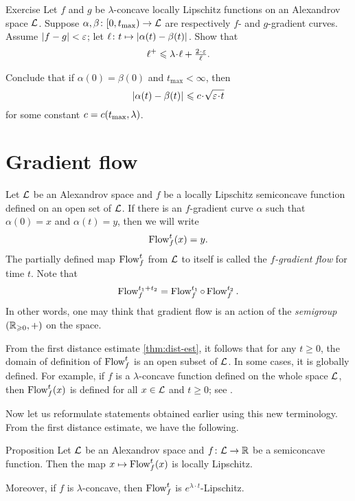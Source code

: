 \begin{thm}{Exercise}\label{lem:fg-dist-est}
Let $f$ and $g$ be $\lambda$-concave locally Lipschitz functions on an Alexandrov space $\mathcal{L}$.
Suppose
$\alpha,\beta\colon[0,t_{\max})\to \mathcal{L}$ are respectively $f$- and $g$-gradient curves.
Assume $|f-g|<\varepsilon$; let $\ell\:t\mapsto\dist{\alpha(t)}{\beta(t)}{}$.
Show that
\[\ell^+\le \lambda\cdot\ell+\tfrac{2\cdot\eps}{\ell}.\]

Conclude that if $\alpha(0)=\beta(0)$ and $t_{\max}<\infty$, then
\[\dist{\alpha(t)}{\beta(t)}{}
\le
\Const\cdot\sqrt{\eps\cdot t}\]
for some constant $c=c(t_{\max},\lambda)$.
\end{thm}

\section{Gradient flow}

Let $\mathcal{L}$ be an Alexandrov space 
and $f$ be a locally Lipschitz semiconcave function defined on an open set of $\mathcal{L}$.
If there is an $f$-gradient curve $\alpha$ such that $\alpha(0)=x$ and $\alpha(t)=y$,
then we will write 
\[\mathop{\rm Flow}\nolimits^t_f(x)=y.\]
The partially defined map $\mathop{\rm Flow}\nolimits^t_f$ from $\mathcal{L}$ to itself is called the \emph{$f$-gradient flow} for time $t$.
Note that
\[\mathop{\rm Flow}\nolimits^{t_1+t_2}_f=\mathop{\rm Flow}\nolimits_f^{t_1}\circ\mathop{\rm Flow}\nolimits_f^{t_2}.\]
In other words, one may think that gradient flow is an action of the \textit{semigroup} $(\mathbb{R}_{\geqslant0},+)$ on the space.
 
From the first distance estimate \ref{thm:dist-est}, 
it follows that for any $t\ge 0$, the domain of definition of $\mathop{\rm Flow}\nolimits^t_f$ is an open subset of $\mathcal{L}$.
In some cases, it is globally defined.
For example, if $f$ is a $\lambda$-concave function defined on the whole space $\mathcal{L}$, then $\mathop{\rm Flow}\nolimits^t_f(x)$ is defined for all $x\in \mathcal{L}$ and $t\ge0$;
see \cite[16.19]{alexander-kapovitch-petrunin2024}.

Now let us reformulate statements obtained earlier using this new terminology.
From the first distance estimate, we have the following.

\begin{thm}{Proposition}\label{prop:GF-is-lip}
Let $\mathcal{L}$ be an Alexandrov space 
and $f\colon\mathcal{L}\to \mathbb{R}$ be a semiconcave function.
Then the map $x\mapsto\mathop{\rm Flow}\nolimits^t_f(x)$ is locally Lipschitz.

Moreover, if $f$ is $\lambda$-concave, then $\mathop{\rm Flow}\nolimits^t_f$ is $e^{\lambda\cdot t}$-Lipschitz.
\end{thm}


